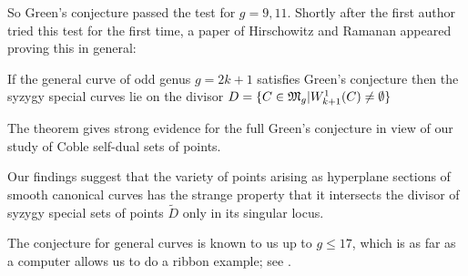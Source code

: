 So Green's conjecture passed the test for $g=9,11$. 
Shortly after the first author tried this test for the first time,
a paper of Hirschowitz and Ramanan appeared proving this in general:

\begin{theorem}[\cite{CO:HR}] If the general curve of odd genus $g=2k+1$ 
satisfies Green's conjecture then the syzygy special curves lie on the divisor
$D=\{ C \in \mathfrak M_g | W^1_{k+1}(C) \ne \emptyset \}$ 
\end{theorem}

The theorem gives strong evidence for the full Green's conjecture in
view of our study of Coble self-dual sets of points.  

\medskip
Our findings suggest that the variety of points arising as 
hyperplane sections of smooth canonical curves has the strange
property that it intersects the divisor of syzygy special sets of
points $\tilde D$ only in its singular locus. 

\bigskip
The conjecture for general curves is known to us up to $g \le 17$, which is 
as far as a computer allows us to do a ribbon example; see \cite{CO:BaEi}.

